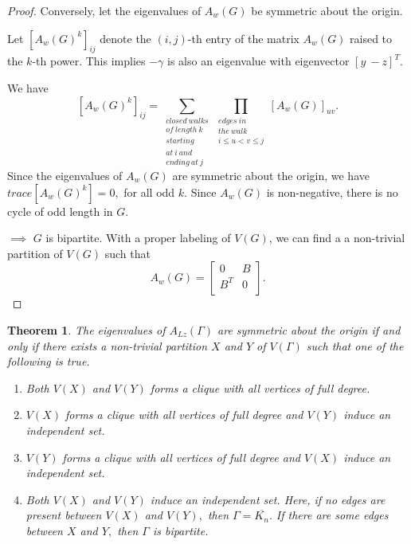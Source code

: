 \documentclass[10pt,a4paper,oneside]{article}
\newtheorem{theorem}{Theorem}
\begin{document}
\begin{proof}
    Conversely, let the eigenvalues of $A_w(G)$ be symmetric about the origin.
	
	Let \([A_{w}(G )^{k}]_{ij}\) denote the \((i,j)\)-th entry of the matrix \(A_{w}(G )\) raised to the \(k\)-th power.
	This implies $-\gamma $ is also an eigenvalue with eigenvector $[y\ -z]^{T}.$
	
	
	
	We have
	$$[A_{w}(G )^{k}]_{ij}=\sum\limits_{\substack{closed \ walks \\ of \ length\  k\\  starting\\  at\  i\  and \\ ending\ at\  j}}\prod\limits_{\substack{edges\ in \\ the \ walk\\ i\leq u<v\leq j}}[A_{w}(G )]_{uv}.$$
Since the eigenvalues of $A_w(G)$ are symmetric about the origin, we have
$trace[A_{w}(G)^k]=0,$ for all odd $k.$ 
Since $A_w(G)$ is non-negative, there is no cycle of odd length in $G.$ 

$\implies$ $G$ is bipartite. With a proper labeling of $V(G)$, we can find a a non-trivial partition of $V(G)$ such that $$A_w(G)=\begin{bmatrix}
0 & B\\
B^T & 0\\
\end{bmatrix}.$$ 
\end{proof}
\begin{theorem}\label{4.19}
The eigenvalues of $A_{Lz}(\Gamma)$ are symmetric about the origin if and only if there exists a non-trivial partition $X$ and $Y$ of $V(\Gamma)$ such that one of the following is true. \begin{enumerate}
\item  Both $V(X)$  and $V(Y)$ forms a clique with all vertices of full degree. 
\item $V(X)$ forms a clique with all vertices of full degree and $V(Y)$ induce an independent set.
\item $V(Y)$ forms a clique with all vertices of full degree and $V(X)$ induce an independent set.
\item  Both $V(X)$  and $V(Y)$ induce an independent set. Here, if no edges are present between $V(X)$ and $V(Y),$ then $\Gamma=\overline{K_n}.$ If there are some edges between $X$ and $Y,$ then $\Gamma$ is bipartite.
\end{enumerate}
\end{theorem}
\end{document}
